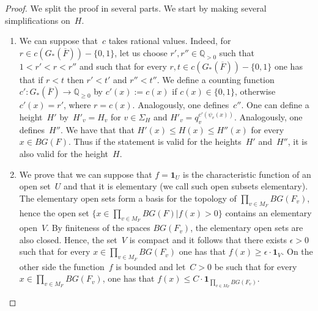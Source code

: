 \documentclass[a4paper,english,12pt]{amsart}
\newcommand{\QQ}{\mathbb{Q}}
\newcommand{\RR}{\mathbb{R}}
\newcommand{\oF}{\overline F}
\newcommand{\vMF}{v\in M_F}
\numberwithin{equation}{subsection}
\begin{document}
\begin{proof}
We split the proof in several parts. %
We start by making several simplifications on~$H$. 
\begin{enumerate}
\item We can suppose that~$c$ takes rational values. Indeed, for $r\in c(G_*(\oF))-\{0,1\}$, let us choose $r', r''\in\QQ_{>0}$ such that $1<r'<r<r''$ and such that for every $r, t\in c(G_*(\oF))-\{0,1\}$ one has that if $r<t$ then $r'<t'$ and $r''<t''$. We define a counting function $c':G_*(\oF)\to\QQ_{\geq 0}$ by $c'(x):= c(x)$ if $c(x)\in\{0,1\}$, otherwise $c'(x)=r'$, where $r=c(x)$. Analogously, one defines~$c''$. One can define a height~$H'$ by~$H'_v=H_v$ for $v\in\Sigma_{H}$ and $H'_v=q_v^{c'(\psi_v(x))}$. Analogously, one defines~$H''$. We have that that $H'(x)\leq H(x)\leq H''(x)$ for every $x\in BG(F)$. Thus if the statement is valid for the heights~$H'$ and~$H''$, it is also valid for the height~$H$. 
\item We prove that we can suppose that $f=\mathbf 1_U$ is the characteristic function of an open set~$U$ and that it is elementary (we call such open subsets elementary). The elementary open sets form a basis for the topology of $\prod_{\vMF}BG(F_v)$, hence the open set $\{x\in\prod_{\vMF}BG(F)|f(x)>0\}$ contains an elementary open~$V$. By finiteness of the spaces $BG(F_v)$, the elementary open sets are also closed. Hence, the set~$V$ is compact and it follows that there exists $\epsilon>0$ such that for every $x\in\prod_{\vMF}BG(F_v)$ one has that $f(x)\geq \epsilon\cdot\mathbf 1_V$. On the other side the function~$f$ is bounded and let~$C>0$ be such that for every $x\in\prod_{\vMF}BG(F_v)$, one has that $f(x)\leq C\cdot\mathbf 1_{\prod_{\vMF} BG(F_v)}$. %

\end{enumerate}
\end{proof}
\end{document}
